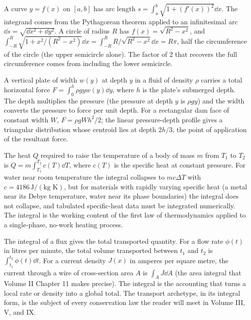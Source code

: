  A curve $y = f(x)$ on
$[a, b]$ has arc length $s = \int_{a}^{b}\sqrt{1 + (f'(x))^{2}}
\dd x$. The integrand comes from the Pythagorean theorem applied
to an infinitesimal arc $\dd s = \sqrt{\dd x^{2} + \dd y^{2}}$.
A circle of radius $R$ has $f(x) = \sqrt{R^{2} - x^{2}}$, and
$\int_{-R}^{R}\sqrt{1 + x^{2}/(R^{2} - x^{2})}\dd x =
\int_{-R}^{R} R/\sqrt{R^{2} - x^{2}}\dd x = R \pi$, half the
circumference of the circle (the upper semicircle alone). The
factor of $2$ that recovers the full circumference comes from
including the lower semicircle.

 A vertical
plate of width $w(y)$ at depth $y$ in a fluid of density $\rho$
carries a total horizontal force $F = \int_{0}^{h} \rho g y w(y)
\dd y$, where $h$ is the plate's submerged depth. The depth
multiplies the pressure (the pressure at depth $y$ is $\rho g y$)
and the width converts the pressure to force per unit depth. For
a rectangular dam face of constant width $W$, $F = \rho g W h^{2}
/ 2$; the linear pressure-depth profile gives a triangular
distribution whose centroid lies at depth $2h/3$, the point of
application of the resultant force.

 The heat $Q$ required to raise the temperature of a body
of mass $m$ from $T_{1}$ to $T_{2}$ is $Q = m \int_{T_{1}}^{T_{2}}
c(T) \dd T$, where $c(T)$ is the specific heat at constant
pressure. For water near room temperature the integral collapses
to $m c \Delta T$ with $c = 4186\,\text{J}/(\text{kg K})$, but for
materials with rapidly varying specific heat (a metal near its
Debye temperature, water near its phase boundaries) the integral
does not collapse, and tabulated specific-heat data must be
integrated numerically. The integral is the working content of
the first law of thermodynamics applied to a single-phase, no-work
heating process.

\begin{archetype}
The integral of a flux gives the total transported quantity. For a
flow rate $\phi(t)$ in litres per minute, the total volume
transported between $t_{1}$ and $t_{2}$ is $\int_{t_{1}}^{t_{2}}
\phi(t) \dd t$. For a current density $J(x)$ in amperes per square
metre, the current through a wire of cross-section area $A$ is
$\int_{A} J \dd A$ (the area integral that Volume II Chapter 11
makes precise). The integral is the accounting that turns a local
rate or density into a global total. The transport archetype, in
its integral form, is the subject of every conservation law the
reader will meet in Volume III, V, and IX.
\end{archetype}


